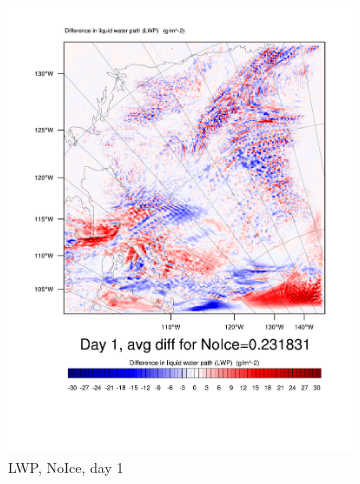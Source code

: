 \begin{figure}[hb]
\centering
	\begin{subfigure}{0.30\textwidth}
		\centering
		\includegraphics[width=\textwidth]{results/noice/Diff_LWP_Day1NoIce.pdf}
		\caption{LWP, NoIce, day 1}
		\label{subfig:LWPr2Day1}
	\end{subfigure}
	\begin{subfigure}{0.30\textwidth}
		\centering

\end{subfigure}
\end{figure}
